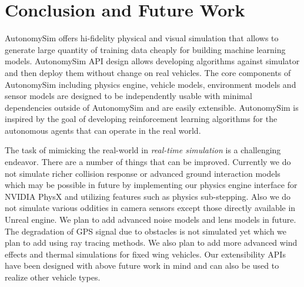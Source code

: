 \documentclass[graybox]{svmult}
\begin{document}
	
	\section{Conclusion and Future Work}
	AutonomySim offers hi-fidelity physical and visual simulation that allows to generate large quantity of training data cheaply for building machine learning models. AutonomySim API design allows developing algorithms against simulator and then deploy them without change on real vehicles. The core components of AutonomySim including physics engine, vehicle models, environment models and sensor models are designed to be independently usable with minimal dependencies outside of AutonomySim and are easily extensible. AutonomySim is inspired by the goal of developing reinforcement learning algorithms for the autonomous agents that can operate in the real world.
	
	The task of mimicking the real-world in \emph{real-time simulation} is a challenging endeavor. There are a number of things that can be improved. Currently we do not simulate richer collision response or advanced ground interaction models which may be possible in future by implementing our physics engine interface for NVIDIA PhysX and utilizing features such as physics sub-stepping. Also we do not simulate various oddities in camera sensors except those directly available in Unreal engine. We plan to add advanced noise models and lens models in future. The degradation of GPS signal due to obstacles is not simulated yet which we plan to add using ray tracing methods. We also plan to add more advanced wind effects and thermal simulations for fixed wing vehicles. Our extensibility APIs have been designed with above future work in mind and can also be used to realize other vehicle types.
	
	
	{\footnotesize 
		}
	
\end{document}
